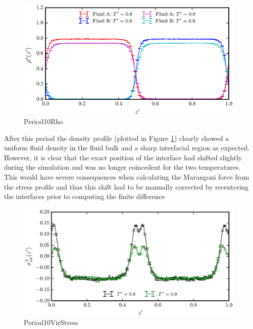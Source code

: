 \begin{figure}[h]
\centering
\includegraphics[scale=0.8]{Period10Rho}
\caption{Period10Rho}
\label{Period10Rho}
\end{figure}
After this period the density profile (plotted in Figure \ref{Period10Rho}) clearly showed a uniform fluid density in the fluid bulk and a sharp interfacial region as expected.
However, it is clear that the exact position of the interface had shifted slightly during the simulation and was no longer coincedent for the two temperatures.
This would have severe consequences when calculating the Marangoni force from the stress profile and thus this shift had to be manually corrected by recentering the interfaces prior to computing the finite difference
\FloatBarrier

\begin{figure}[h]
\centering
\includegraphics[scale=0.8]{Period10VirStress}
\caption{Period10VirStress}
\label{Period10VirStress}
\end{figure}


